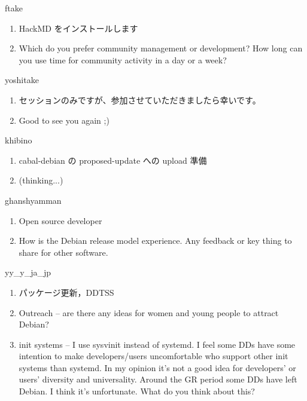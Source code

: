 \begin{prework}{ ftake }
  \begin{enumerate}
  \item HackMD をインストールします
  \item Which do you prefer community management or development? How long can you use time for community activity in a day or a week?
  \end{enumerate}
\end{prework}

\begin{prework}{ yoshitake }
  \begin{enumerate}
  \item セッションのみですが、参加させていただきましたら幸いです。
  \item Good to see you again ;)
  \end{enumerate}
\end{prework}

\begin{prework}{ khibino }
  \begin{enumerate}
  \item cabal-debian の proposed-update への upload 準備
  \item (thinking...)
  \end{enumerate}
\end{prework}

\begin{prework}{ ghanshyamman }
  \begin{enumerate}
  \item Open source developer
  \item How is the Debian release model experience. Any feedback or key thing to share for other software.
  \end{enumerate}
\end{prework}

\begin{prework}{ yy\_y\_ja\_jp }
  \begin{enumerate}
  \item パッケージ更新，DDTSS
  \item Outreach -- are there any ideas for women and young people to attract Debian?
  \item init systems -- I use sysvinit instead of systemd. I feel some DDs have some intention to make developers/users uncomfortable who support other init systems than systemd. In my opinion it's not a good idea for developers' or users' diversity and universality. Around the GR period some DDs have left Debian. I think it's unfortunate. What do you think about this?
  \end{enumerate}
\end{prework}

